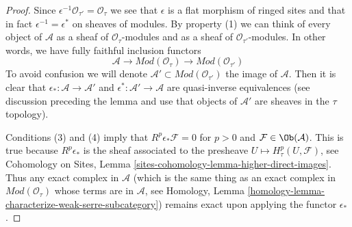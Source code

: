 \begin{proof}
Since $\epsilon^{-1}\mathcal{O}_{\tau'} = \mathcal{O}_\tau$
we see that $\epsilon$ is a flat morphism of ringed sites
and that in fact $\epsilon^{-1} = \epsilon^*$ on sheaves
of modules. By property (1) we can think of every object of
$\mathcal{A}$ as a sheaf of $\mathcal{O}_\tau$-modules
and as a sheaf of $\mathcal{O}_{\tau'}$-modules.
In other words, we have fully faithful inclusion functors
$$
\mathcal{A} \to \textit{Mod}(\mathcal{O}_\tau) \to
\textit{Mod}(\mathcal{O}_{\tau'})
$$
To avoid confusion we will denote
$\mathcal{A}' \subset \textit{Mod}(\mathcal{O}_{\tau'})$
the image of $\mathcal{A}$. Then it is clear that
$\epsilon_* : \mathcal{A} \to \mathcal{A}'$ and
$\epsilon^* : \mathcal{A}' \to \mathcal{A}$ are
quasi-inverse equivalences (see discussion preceding
the lemma and use that objects of $\mathcal{A}'$ are
sheaves in the $\tau$ topology).

\medskip\noindent
Conditions (3) and (4) imply that $R^p\epsilon_*\mathcal{F} = 0$
for $p > 0$ and $\mathcal{F} \in \Ob(\mathcal{A})$.
This is true because $R^p\epsilon_*$ is the sheaf associated
to the presheave $U \mapsto H^p_\tau(U, \mathcal{F})$, see
Cohomology on Sites, Lemma \ref{sites-cohomology-lemma-higher-direct-images}.
Thus any exact complex in $\mathcal{A}$ (which is the same thing
as an exact complex in $\textit{Mod}(\mathcal{O}_\tau)$
whose terms are in $\mathcal{A}$, see
Homology, Lemma \ref{homology-lemma-characterize-weak-serre-subcategory})
remains exact upon applying the functor $\epsilon_*$.


\end{proof}
